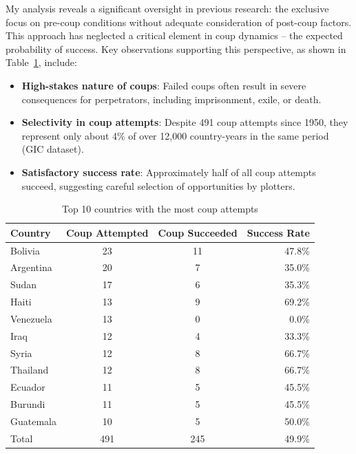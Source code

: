 \documentclass[
  12pt,
]{report}
\begin{document}
My analysis reveals a significant oversight in previous research: the
exclusive focus on pre-coup conditions without adequate consideration of
post-coup factors. This approach has neglected a critical element in
coup dynamics -- the expected probability of success. Key observations
supporting this perspective, as shown in Table~\ref{tbl-coups}, include:

\begin{itemize}
\item
  \textbf{High-stakes nature of coups}: Failed coups often result in
  severe consequences for perpetrators, including imprisonment, exile,
  or death.
\item
  \textbf{Selectivity in coup attempts}: Despite 491 coup attempts since
  1950, they represent only about 4\% of over 12,000 country-years in
  the same period (GIC dataset).
\item
  \textbf{Satisfactory success rate}: Approximately half of all coup
  attempts succeed, suggesting careful selection of opportunities by
  plotters.
\end{itemize}

\begingroup
\setlength{}
\setlength{}\fontsize{12.0pt}{14.4pt}\selectfont
\setlength{\LTpost}{0mm}

\begin{longtable}{@{\extracolsep{\fill}}lccr}

\caption{\label{tbl-coups}Top 10 countries with the most coup attempts}

\tabularnewline

\toprule
Country & Coup Attempted & Coup Succeeded & Success Rate \\ 
\midrule\addlinespace[2.5pt]
Bolivia & 23 & 11 & 47.8\% \\ 
Argentina & 20 & 7 & 35.0\% \\ 
Sudan & 17 & 6 & 35.3\% \\ 
Haiti & 13 & 9 & 69.2\% \\ 
Venezuela & 13 & 0 & 0.0\% \\ 
Iraq & 12 & 4 & 33.3\% \\ 
Syria & 12 & 8 & 66.7\% \\ 
Thailand & 12 & 8 & 66.7\% \\ 
Ecuador & 11 & 5 & 45.5\% \\ 
Burundi & 11 & 5 & 45.5\% \\ 
Guatemala & 10 & 5 & 50.0\% \\ 
Total & 491 & 245 & 49.9\% \\ 
\bottomrule

\end{longtable}
\end{document}
